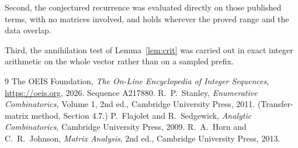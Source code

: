 \documentclass[11pt,a4paper]{article}
\theoremstyle{plain}
\theoremstyle{definition}
\begin{document}
Second, the conjectured recurrence was evaluated directly on those published terms, with no
matrices involved, and holds wherever the proved range and the data overlap.

Third, the annihilation test of Lemma~\ref{lem:crit} was carried out in exact integer
arithmetic on the whole vector rather than on a sampled prefix.

\begin{thebibliography}{9}
 The OEIS Foundation, \emph{The On-Line Encyclopedia of Integer
Sequences}, \url{https://oeis.org}, 2026. Sequence A217880.
 R.~P.~Stanley, \emph{Enumerative Combinatorics}, Volume 1, 2nd ed.,
Cambridge University Press, 2011. (Transfer-matrix method, Section 4.7.)
 P.~Flajolet and R.~Sedgewick, \emph{Analytic Combinatorics}, Cambridge
University Press, 2009.
 R.~A.~Horn and C.~R.~Johnson, \emph{Matrix Analysis}, 2nd ed., Cambridge
University Press, 2013.
\end{thebibliography}
\end{document}
